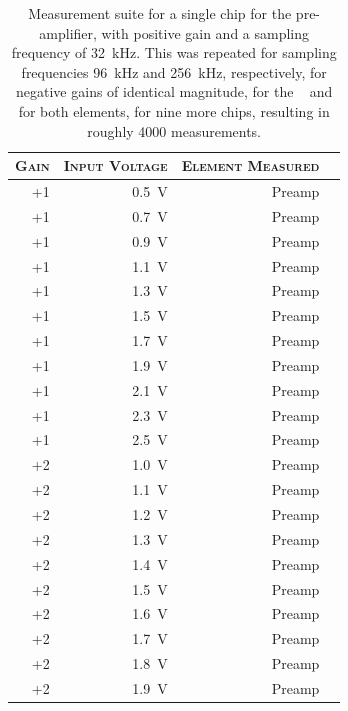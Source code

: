 \begin{table}
    \centering
    \caption{%
            Measurement  suite  for  a  single  chip  for  the  pre-amplifier,
            with    positive    gain    and   a    sampling    frequency    of
            \SI{32}{\kilo\hertz}. This was  repeated for  sampling frequencies
            \SI{96}{\kilo\hertz} and  \SI{256}{\kilo\hertz}, respectively, for
            negative gains of identical magnitude,  for the \sdm~ and for both
            elements,  for nine  more chips,  resulting in  roughly \num{4000}
            measurements.%
        }
    \label{tab:measurementSuite}
    \scriptsize
    \begin{tabular}{rrrr}
        \toprule
        \textsc{Gain} & \textsc{Input Voltage} & \textsc{Element Measured} \\
        \midrule
        +1 & \SI{0.5}{\volt} & Preamp \\
        +1 & \SI{0.7}{\volt} & Preamp \\
        +1 & \SI{0.9}{\volt} & Preamp \\
        +1 & \SI{1.1}{\volt} & Preamp \\
        +1 & \SI{1.3}{\volt} & Preamp \\
        +1 & \SI{1.5}{\volt} & Preamp \\
        +1 & \SI{1.7}{\volt} & Preamp \\
        +1 & \SI{1.9}{\volt} & Preamp \\
        +1 & \SI{2.1}{\volt} & Preamp \\
        +1 & \SI{2.3}{\volt} & Preamp \\
        +1 & \SI{2.5}{\volt} & Preamp \\
        \midrule
        +2 & \SI{1.0}{\volt} & Preamp \\
        +2 & \SI{1.1}{\volt} & Preamp \\
        +2 & \SI{1.2}{\volt} & Preamp \\
        +2 & \SI{1.3}{\volt} & Preamp \\
        +2 & \SI{1.4}{\volt} & Preamp \\
        +2 & \SI{1.5}{\volt} & Preamp \\
        +2 & \SI{1.6}{\volt} & Preamp \\
        +2 & \SI{1.7}{\volt} & Preamp \\
        +2 & \SI{1.8}{\volt} & Preamp \\
        +2 & \SI{1.9}{\volt} & Preamp \\

\end{tabular}
\end{table}
